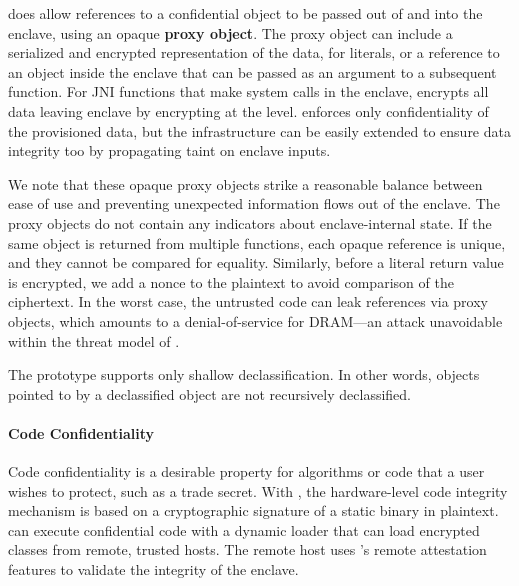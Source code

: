 \sysname{} does allow references to a confidential object to be
passed out of and into the enclave, using an opaque {\bf proxy object}.
The proxy object can include a serialized and encrypted representation of the data, for literals,
or a reference to an object inside the enclave that can be passed as an argument to a subsequent function.
For JNI functions that make system calls in the enclave, \sysname{} encrypts all data leaving enclave by encrypting at the \sgx{} level.
\sysname{} enforces only confidentiality of the provisioned data, but the infrastructure can be easily extended to ensure data integrity too by propagating taint on enclave inputs.

We note that these opaque proxy objects strike a reasonable balance between
ease of use and preventing unexpected information flows out of the enclave.
The proxy objects do not contain any indicators about enclave-internal state.
If the same object is returned from multiple functions, each opaque reference is unique, and they cannot be compared for equality.
Similarly, before a literal return value is encrypted, we add a nonce to the plaintext to avoid comparison of the ciphertext.
In the worst case, the untrusted code can leak references via proxy objects, which amounts to a denial-of-service for DRAM---an attack
unavoidable within the threat model of \sgx{}.



The \sysname{} prototype supports only shallow declassification.
In other words, objects pointed to by a declassified object are not recursively declassified.


\paragraph{Code Confidentiality}
Code confidentiality is a desirable property for algorithms or code that 
a user wishes to protect, such as a trade secret.
With \sgx{}, the hardware-level code integrity mechanism is based on a cryptographic
signature of a static binary in plaintext.
\sysname{} can execute confidential code with a dynamic loader that can 
load encrypted classes from remote, trusted hosts.
The remote host uses \sgx{}'s remote attestation features to validate the integrity of the \sysname{} enclave.

